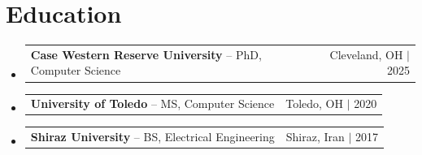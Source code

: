 \documentclass[letterpaper,13pt]{article}
\makeatletter
\newcommand{\resumeProjectHeading}[2]{
    \item
    \begin{tabular*}{0.97\textwidth}{l@{\extracolsep{\fill}}r}
      \small#1 & #2 \\
    \end{tabular*}\vspace{-4pt}
}
\newcommand{\resumeSubHeadingListStart}{\begin{itemize}[leftmargin=0.15in, label={}]}
\newcommand{\resumeSubHeadingListEnd}{\end{itemize}}
\makeatother
\begin{document}
\section{Education}
\resumeSubHeadingListStart
  \resumeProjectHeading{\textbf{Case Western Reserve University} -- PhD, Computer Science}{Cleveland, OH $|$ 2025}
  \resumeProjectHeading{\textbf{University of Toledo} -- MS, Computer Science}{Toledo, OH $|$ 2020}
  \resumeProjectHeading{\textbf{Shiraz University} -- BS, Electrical Engineering}{Shiraz, Iran $|$ 2017}
\resumeSubHeadingListEnd
 
\end{document}

